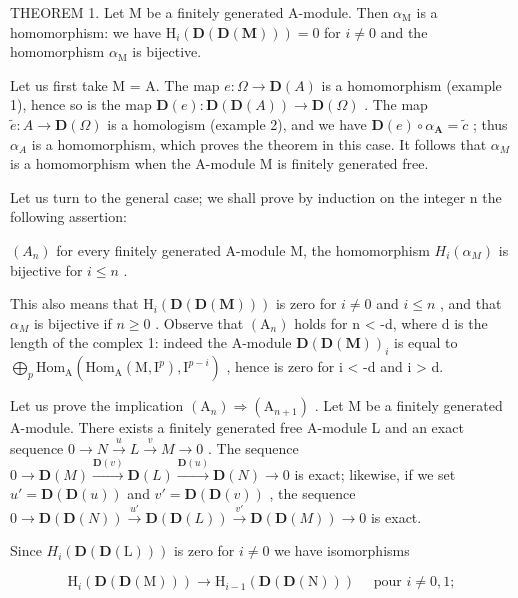 THEOREM 1. Let M be a finitely generated A-module. Then \(\alpha_{\mathrm{M}}\) is a homomorphism: we have \(\mathrm{H}_{i}(\mathbf{D}(\mathbf{D}(\mathbf{M}))) = 0\) for \(i \neq 0\) and the homomorphism \(\alpha_{\mathrm{M}}\) is bijective.

Let us first take M = A. The map \(e : \Omega \to \mathbf{D}(A)\) is a homomorphism (example 1), hence so is the map \(\mathbf{D}(e) : \mathbf{D}(\mathbf{D}(A)) \to \mathbf{D}(\Omega)\) . The map \(\tilde{e} : A \to \mathbf{D}(\Omega)\) is a homologism (example 2), and we have \(\mathbf{D}(e) \circ \alpha_{\mathbf{A}} = \tilde{c}\) ; thus \(\alpha_{A}\) is a homomorphism, which proves the theorem in this case. It follows that \(\alpha_{M}\) is a homomorphism when the A-module M is finitely generated free.

Let us turn to the general case; we shall prove by induction on the integer n the following assertion:

\((A_{n})\) for every finitely generated A-module M, the homomorphism \(H_{i}(\alpha_{M})\) is bijective for \(i \leqslant n\) .

This also means that \(\mathrm{H}_{i}(\mathbf{D}(\mathbf{D}(\mathbf{M})))\) is zero for \(i \neq 0\) and \(i \leqslant n\) , and that \(\alpha_{M}\) is bijective if \(n \geqslant 0\) . Observe that \((\mathrm{A}_{n})\) holds for n \textless{} -d, where d is the length of the complex 1: indeed the A-module \(\mathbf{D}(\mathbf{D}(\mathbf{M}))_{i}\) is equal to \(\bigoplus_{p}\mathrm{Hom}_{\mathrm{A}}(\mathrm{Hom}_{\mathrm{A}}(\mathrm{M},\mathrm{I}^{p}),\mathrm{I}^{p-i})\) , hence is zero for i \textless{} -d and i \textgreater{} d.

Let us prove the implication \((\mathrm{A}_{n}) \Rightarrow (\mathrm{A}_{n+1})\) . Let M be a finitely generated A-module. There exists a finitely generated free A-module L and an exact sequence \(0 \to N \xrightarrow{u} L \xrightarrow{v} M \to 0\) . The sequence \(0 \to \mathbf{D}(M) \xrightarrow{\mathbf{D}(v)} \mathbf{D}(L) \xrightarrow{\mathbf{D}(u)} \mathbf{D}(N) \to 0\) is exact; likewise, if we set \(u' = \mathbf{D}(\mathbf{D}(u))\) and \(v' = \mathbf{D}(\mathbf{D}(v))\) , the sequence \(0 \to \mathbf{D}(\mathbf{D}(N)) \xrightarrow{u'} \mathbf{D}(\mathbf{D}(L)) \xrightarrow{v'} \mathbf{D}(\mathbf{D}(M)) \to 0\) is exact.

Since \(H_{i}(\mathbf{D}(\mathbf{D}(\mathrm{L})))\) is zero for \(i \neq 0\) we have isomorphisms

\[
\mathrm{H} _ {i} (\mathbf {D} (\mathbf {D} (\mathrm{M}))) \longrightarrow \mathrm{H} _ {i - 1} (\mathbf {D} (\mathbf {D} (\mathrm{N}))) \quad \text { pour } i \neq 0, 1;
\]

